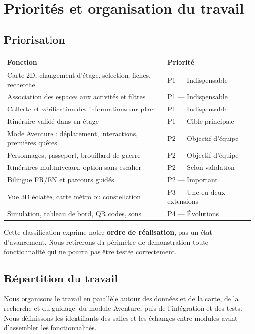 \documentclass[11pt,a4paper]{article}
\begin{document}
\section{Priorités et organisation du travail}
\subsection{Priorisation}
\begin{longtable}{p{}p{}}
\toprule Fonction & Priorité \\ \midrule
Carte 2D, changement d'étage, sélection, fiches, recherche & P1 --- Indispensable\\
Association des espaces aux activités et filtres & P1 --- Indispensable\\
Collecte et vérification des informations sur place & P1 --- Indispensable\\
Itinéraire validé dans un étage & P1 --- Cible principale\\
Mode Aventure : déplacement, interactions, premières quêtes & P2 --- Objectif d'équipe\\
Personnages, passeport, brouillard de guerre & P2 --- Objectif d'équipe\\
Itinéraires multiniveaux, option sans escalier & P2 --- Selon validation\\
Bilingue FR/EN et parcours guidés & P2 --- Important\\
Vue 3D éclatée, carte métro ou constellation & P3 --- Une ou deux extensions\\
Simulation, tableau de bord, QR codes, sons & P4 --- Évolutions\\
\bottomrule
\end{longtable}
Cette classification exprime notre \textbf{ordre de réalisation}, pas un état d'avancement. Nous retirerons du périmètre de démonstration toute fonctionnalité qui ne pourra pas être testée correctement.

\subsection{Répartition du travail}
Nous organisons le travail en parallèle autour des données et de la carte, de la recherche et du guidage, du module Aventure, puis de l'intégration et des tests. Nous définissons les identifiants des salles et les échanges entre modules avant d'assembler les fonctionnalités.
\end{document}
